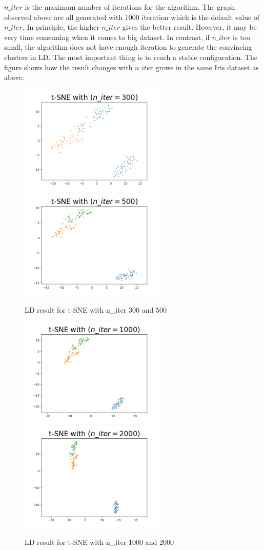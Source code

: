 \noindent $n\_iter$ is the maximum number of iterations for the algorithm. The graph observed above are all generated with 1000 iteration which is the default value of $n\_iter$. In principle, the higher $n\_iter$ gives the better result. However, it may be very time consuming when it comes to big dataset. In contrast, if $n\_iter$ is too small, the algorithm does not have enough iteration to generate the convincing clusters in LD. The most important thing is to reach a stable configuration. The figure shows how the result changes with $n\_iter$ grows in the same Iris dataset as above:

\begin{figure}[H]
\centering  %
{
\label{Fig.sub.1}
\includegraphics[width=7cm,height=3.5cm\textwidth]{images/t-sne/t-sne_n_iter_300.png}}
{
\label{Fig.sub.2}
\includegraphics[width=7cm,height=3.5cm\textwidth]{images/t-sne/t-sne_n_iter_500.png}}
\caption{LD result for t-SNE with n\_iter 300 and 500}
\end{figure}

\begin{figure}[H]
\centering  %
{
\label{Fig.sub.1}
\includegraphics[width=7cm,height=3.5cm\textwidth]{images/t-sne/t-sne_n_iter_1000.png}}
{
\label{Fig.sub.2}
\includegraphics[width=7cm,height=3.5cm\textwidth]{images/t-sne/t-sne_n_iter_2000.png}}
\caption{LD result for t-SNE with n\_iter 1000 and 2000}
\end{figure}


